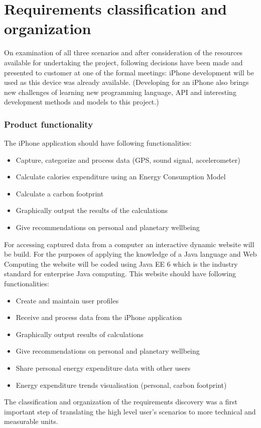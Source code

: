 \documentclass[12pt, a4paper]{report}   %
\begin{document}
\section{Requirements classification and \\ organization}
On examination of all three scenarios and after consideration of the resources available for undertaking the project, following decisions have been made and presented to customer at one of the formal meetings: iPhone development will be used as this device was already available. (Developing for an iPhone also brings new challenges of learning new programming language, API and interesting development methods and models to this project.)

\subsubsection*{Product functionality}

The iPhone application should have following functionalities:

	\begin{itemize}
	\item Capture, categorize and process data (GPS, sound signal, accelerometer)
	\item Calculate calories expenditure using an Energy Consumption Model
	\item Calculate a carbon footprint
	\item Graphically output the results of the calculations
	\item Give recommendations on personal and planetary wellbeing
	\end{itemize}
For accessing captured data from a computer an interactive dynamic website will be build. For the purposes of applying the knowledge of a Java language and Web Computing the website will be coded using Java EE 6 which is the industry standard for enterprise Java computing. This website should have following functionalities:
\begin{itemize}
\item Create and maintain user profiles
\item Receive and process data from the iPhone application
\item Graphically output results of calculations
\item Give recommendations on personal and planetary wellbeing
\item Share personal energy expenditure data with other users
\item Energy expenditure trends visualisation (personal, carbon footprint)
\end{itemize}
The classification and organization of the requirements discovery was a first important step of translating the high level user’s scenarios to more technical and measurable units.
\end{document}
